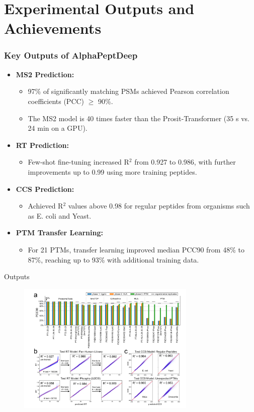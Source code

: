 \documentclass{beamer}
\begin{document}
\section{Experimental Outputs and Achievements}
\begin{frame}
  \frametitle{Key Outputs of AlphaPeptDeep}
  \begin{itemize}
    \item \textbf{MS2 Prediction:} 
      \begin{itemize}
        \item 97\% of significantly matching PSMs achieved Pearson correlation coefficients (PCC) $\geq$ 90\%.
        \item The MS2 model is 40 times faster than the Prosit-Transformer (35 s vs. 24 min on a GPU).
      \end{itemize}
    \item \textbf{RT Prediction:} 
      \begin{itemize}
        \item Few-shot fine-tuning increased R$^2$ from 0.927 to 0.986, with further improvements up to 0.99 using more training peptides.
      \end{itemize}
    \item \textbf{CCS Prediction:} 
      \begin{itemize}
        \item Achieved R$^2$ values above 0.98 for regular peptides from organisms such as E. coli and Yeast.
      \end{itemize}
    \item \textbf{PTM Transfer Learning:} 
      \begin{itemize}
        \item For 21 PTMs, transfer learning improved median PCC90 from 48\% to 87\%, reaching up to 93\% with additional training data.
      \end{itemize}
  \end{itemize}
\end{frame}

\begin{frame}{Outputs}
  \begin{figure}[ht]
  \centering
  \includegraphics[width=0.76\textwidth]{Screenshot from 2025-03-12 20-43-51.png}

 
  \label{fig:AlphaPeptDeep_Fig3}
\end{figure}

\end{frame}
\end{document}
